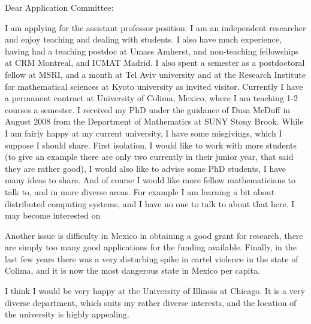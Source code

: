 \documentclass[12pt]{letter}
\date{Fall 2018}
\begin{document}
\begin{letter}{
}
\opening{Dear Application Committee:}   
I am applying for the assistant professor position. I am an independent researcher and enjoy teaching and dealing with students.
I also have much experience, having had a teaching postdoc at Umass Amherst, 
and non-teaching fellowships at CRM Montreal, and ICMAT Madrid. I also spent a semester as a postdoctoral fellow at MSRI, and a
month at Tel Aviv university and at the Research Institute for mathematical
sciences at Kyoto university as invited visitor. Currently I have a permanent contract at University of Colima,  Mexico, where I am teaching 1-2 courses a semester.
I received my PhD under the 
guidance of Dusa McDuff
in August 2008 from
the Department of Mathematics at SUNY Stony Brook.  While I am fairly happy at my current university,  
I have some misgivings, which I suppose I should share.
First isolation, I would like to work with more students (to give an example there are only two currently in their junior year, that said they are rather good),
I would also like to advise some PhD students, I have many ideas to share. And of course I would like more fellow mathematicians to talk to, and in more diverse areas. For example I am learning a bit about distributed computing systems, and I have no one to talk to about that here. I may become interested on

Another issue is difficulty in Mexico in obtaining a good grant for research, there are simply too many good applications for the funding available.
Finally, in the last few years there was a very disturbing spike in cartel violence in the state of Colima, and it is now the most dangerous state in Mexico per capita. 


I think I would be very happy at the University of Illinois at Chicago.  It is a very diverse department, 
which suits my rather diverse interests,  and the location of the university
is highly appealing. 





\end{letter}
\end{document}
